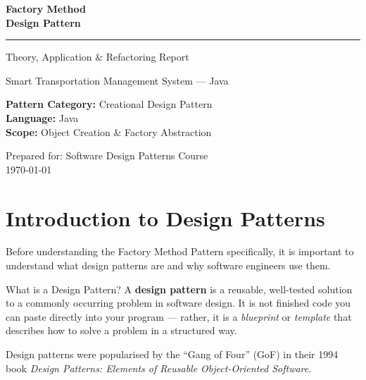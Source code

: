\documentclass[12pt, a4paper]{article}
\begin{document}
\begin{titlepage}
    \centering
    \vspace*{1.5cm}

    {\Huge\bfseries\color{primaryblue} Factory Method\\[6pt] Design Pattern}

    \vspace{0.4cm}
    {\large\color{codegray}\rule{10cm}{1pt}}

    \vspace{0.6cm}
    {\Large\color{secondaryblue} Theory, Application \& Refactoring Report}

    \vspace{0.4cm}
    {\normalsize\color{codegray} Smart Transportation Management System --- Java}

    \vspace{2.5cm}

    \begin{tcolorbox}[
        colback=lightblue,
        colframe=primaryblue,
        width=10cm,
        arc=6pt,
        boxrule=1pt,
        halign=center
    ]
        \centering
        \textbf{\color{primaryblue}Pattern Category:} Creational Design Pattern\\[4pt]
        \textbf{\color{primaryblue}Language:} Java\\[4pt]
        \textbf{\color{primaryblue}Scope:} Object Creation \& Factory Abstraction
    \end{tcolorbox}

    \vfill

    {\small\color{codegray} Prepared for: Software Design Patterns Course}\\[4pt]
    {\small\color{codegray} \today}
\end{titlepage}

\tableofcontents
\newpage

\section{Introduction to Design Patterns}

Before understanding the Factory Method Pattern specifically, it is important to understand what design patterns are and why software engineers use them.

\begin{definitionbox}{What is a Design Pattern?}
A \textbf{design pattern} is a reusable, well-tested solution to a commonly occurring problem in software design. It is not finished code you can paste directly into your program --- rather, it is a \textit{blueprint} or \textit{template} that describes how to solve a problem in a structured way.

Design patterns were popularised by the ``Gang of Four'' (GoF) in their 1994 book \textit{Design Patterns: Elements of Reusable Object-Oriented Software}.
\end{definitionbox}
\end{document}
